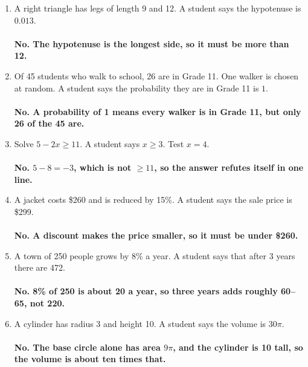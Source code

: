 \documentclass[11pt,a4paper]{article}
\newcommand{\ans}[1]{\ {\color{keyred}\bfseries #1}}
\newcommand{\ans}[1]{}
\begin{document}
\begin{enumerate}[leftmargin=20pt,itemsep=10pt]
\item A right triangle has legs of length 9 and 12. A student says the hypotenuse is $0.013$.\\
  \underline{\hspace{\linewidth}}
  \ans{\\ No. The hypotenuse is the longest side, so it must be more than 12.}

\item Of 45 students who walk to school, 26 are in Grade 11. One walker is chosen at random.
  A student says the probability they are in Grade 11 is $1$.\\
  \underline{\hspace{\linewidth}}
  \ans{\\ No. A probability of 1 means every walker is in Grade 11, but only 26 of the 45 are.}

\item Solve $5-2x\ge11$. A student says $x\ge3$. Test $x=4$.\\
  \underline{\hspace{\linewidth}}
  \ans{\\ No. $5-8=-3$, which is not $\ge11$, so the answer refutes itself in one line.}

\item A jacket costs \$260 and is reduced by 15\%. A student says the sale price is \$299.\\
  \underline{\hspace{\linewidth}}
  \ans{\\ No. A discount makes the price smaller, so it must be under \$260.}

\item A town of 250 people grows by 8\% a year. A student says that after 3 years there are 472.\\
  \underline{\hspace{\linewidth}}
  \ans{\\ No. 8\% of 250 is about 20 a year, so three years adds roughly 60--65, not 220.}

\item A cylinder has radius 3 and height 10. A student says the volume is $30\pi$.\\
  \underline{\hspace{\linewidth}}
  \ans{\\ No. The base circle alone has area $9\pi$, and the cylinder is 10 tall, so the volume is about ten times that.}
\end{enumerate}
\end{document}
